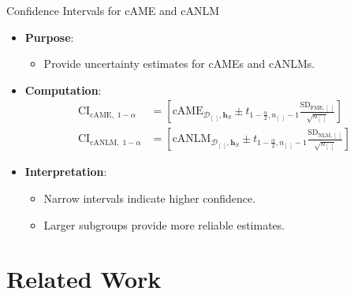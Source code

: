 \documentclass[11pt,compress,t,notes=noshow, aspectratio=169, xcolor=table]{beamer}
\newcommand{\boldhS}{\bm{h}_{S}}
\begin{document}
\begin{frame}{Confidence Intervals for cAME and cANLM}
\begin{itemize}
\item \textbf{Purpose}:
\begin{itemize}
\item Provide uncertainty estimates for cAMEs and cANLMs.
\end{itemize}
\item \textbf{Computation}:
\begin{align*}
\text{CI}_{\text{cAME}, \; 1 - \alpha} &= \left[\text{cAME}_{\mathcal{D}_{[\;]}, \boldhS} \pm t_{1-\frac{\alpha}{2}, n_{[\;]}-1} \frac{\text{SD}_{\text{FME}, [\;]}}{\sqrt{n_{[\;]}}} \right] \\
\text{CI}_{\text{cANLM}, \; 1 - \alpha} &= \left[\text{cANLM}_{\mathcal{D}_{[\;]}, \boldhS} \pm t_{1-\frac{\alpha}{2}, n_{[\;]}-1} \frac{\text{SD}_{\text{NLM}, [\;]}}{\sqrt{n_{[\;]}}} \right]
\end{align*}
\item \textbf{Interpretation}:
\begin{itemize}
\item Narrow intervals indicate higher confidence.
\item Larger subgroups provide more reliable estimates.
\end{itemize}
\end{itemize}
\end{frame}

\section{Related Work}
\end{document}
